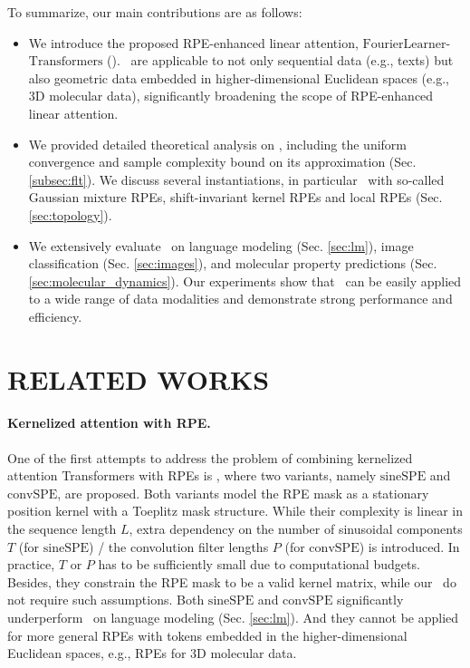 To summarize, our main contributions are as follows:
\vspace{-2mm}
\begin{itemize}
    \item We introduce the proposed RPE-enhanced linear attention,    $\mathrm{FourierLearner}$-$\mathrm{Transformers}$ (\FLTs). \FLTs~are applicable to not only sequential data (e.g., texts) but also geometric data embedded in higher-dimensional Euclidean spaces (e.g., 3D molecular data), significantly broadening the scope of RPE-enhanced linear attention.
    
    \item We provided detailed theoretical analysis on \FLTs, including the uniform convergence and sample complexity bound on its approximation (Sec. \ref{subsec:flt}). We discuss several instantiations, in particular \FLTs\ with so-called Gaussian mixture RPEs, shift-invariant kernel RPEs and local RPEs (Sec. \ref{sec:topology}).

    \item We extensively evaluate \FLTs~on language modeling (Sec. \ref{sec:lm}), image classification (Sec. \ref{sec:images}), and molecular property predictions (Sec. \ref{sec:molecular_dynamics}). Our experiments show that \FLTs~can be easily applied to a wide range of data modalities and demonstrate strong performance and efficiency. 
\end{itemize}
\section{RELATED WORKS}
\label{sec:related}
\paragraph{Kernelized attention with RPE.}
One of the first attempts to address the problem of combining kernelized attention Transformers with RPEs is \cite{liutkus}, where two variants, namely $\mathrm{sineSPE}$ and $\mathrm{convSPE}$, are proposed. Both variants model the RPE mask as a stationary position kernel with a Toeplitz mask structure. While their complexity is linear in the sequence length $L$, extra dependency on the number of sinusoidal components $T$ (for $\mathrm{sineSPE}$) / the convolution filter lengths $P$ (for $\mathrm{convSPE}$) is introduced. In practice, $T$ or $P$ has to be sufficiently small due to computational budgets. Besides, they constrain the RPE mask to be a valid kernel matrix, while our \FLTs~do not require such assumptions. Both $\mathrm{sineSPE}$ and $\mathrm{convSPE}$ significantly underperform \FLTs~on language modeling (Sec. \ref{sec:lm}). And they cannot be applied for more general RPEs with tokens embedded in the higher-dimensional Euclidean spaces, e.g., RPEs for 3D molecular data.

